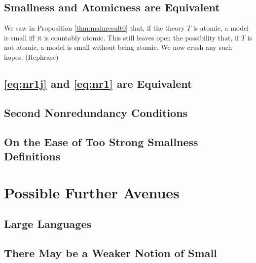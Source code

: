 \documentclass{article}
\theoremstyle{nonumberplain}
\begin{document}
\subsection{Smallness and Atomicness are Equivalent}\label{sec:mainresult}

We saw in Proposition \ref{thm:mainresult0} that, if the theory $T$ is atomic, a model is small iff it is countably atomic. This still leaves open the possibility that, if $T$ is not atomic, a model is small without being atomic. We now crush any such hopes. (Rephrase)

\subsection{\eqref{eq:nr1j} and \eqref{eq:nr1} are Equivalent}\label{sec:nr1jeqvnr1}

\subsection{Second Nonredundancy Conditions}

\subsection{On the Ease of Too Strong Smallness Definitions}

\section{Possible Further Avenues}

\subsection{Large Languages}

\subsection{There May be a Weaker Notion of Small}\label{sec:evensmaller}


%
%
\end{document}
